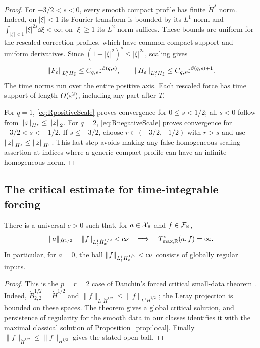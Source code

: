 \begin{proof}
For $-3/2<s<0$, every smooth compact profile has finite $\dot H^s$ norm. Indeed, on $|\xi|<1$ its Fourier transform is bounded by its $L^1$ norm and $\int_{|\xi|<1}|\xi|^{2s}\dd\xi<\infty$; on $|\xi|\ge1$ its $L^2$ norm suffices. These bounds are uniform for the rescaled correction profiles, which have common compact support and uniform derivatives. Since
$(1+|\xi|^2)^s\le|\xi|^{2s}$, scaling gives
\begin{equation}\label{eq:RnegativeScale}
 \left\lVert F_\varepsilon\right\rVert_{L^q_tH^s_x}\le C_{q,s}\varepsilon^{\beta(q,s)},\qquad
 \left\lVert H_\varepsilon\right\rVert_{L^q_tH^s_x}\le C_{q,s}\varepsilon^{\beta(q,s)+1}.
\end{equation}
The time norms run over the entire positive axis. Each rescaled force has time support of length $O(\varepsilon^2)$, including any part after $T$.

For $q=1$, \eqref{eq:RpositiveScale} proves convergence for $0\le s<1/2$; all $s<0$ follow from $\left\lVert z\right\rVert_{H^s}\le\left\lVert z\right\rVert_2$. For $q=2$, \eqref{eq:RnegativeScale} proves convergence for $-3/2<s<-1/2$. If $s\le-3/2$, choose $r\in(-3/2,-1/2)$ with $r>s$ and use $\left\lVert z\right\rVert_{H^s}\le\left\lVert z\right\rVert_{H^r}$. This last step avoids making any false homogeneous scaling assertion at indices where a generic compact profile can have an infinite homogeneous norm.
\end{proof}

\subsection{The critical estimate for time-integrable forcing}
\begin{proposition}\label{prop:Rcritical1}
There is a universal $c>0$ such that, for $a\in\mathcal X_{\mathbb R}$ and $f\in\mathcal F_{\mathbb R}$,
\[
 \left\lVert a\right\rVert_{\dot H^{1/2}}+\left\lVert f\right\rVert_{L^1_t\dot H^{1/2}_x}<c\nu
 \quad\Longrightarrow\quad T^\nu_{\max,\mathbb R}(a,f)=\infty.
\]
In particular, for $a=0$, the ball $\left\lVert f\right\rVert_{L^1_tH^{1/2}_x}<c\nu$ consists of globally regular inputs.
\end{proposition}
\begin{proof}
This is the $p=r=2$ case of Danchin's forced critical small-data theorem
\cite[Theorem~2.3.1, pp.~47--49]{danchin}. Indeed,
$\dot B^{1/2}_{2,2}=\dot H^{1/2}$ and
$\|f\|_{\widetilde L^1\dot H^{1/2}}\le\|f\|_{L^1\dot H^{1/2}}$;
the Leray projection is bounded on these spaces. The theorem gives a global
critical solution, and persistence of regularity for the smooth data in our
classes identifies it with the maximal classical solution of
Proposition~\ref{prop:local}. Finally
$\|f\|_{\dot H^{1/2}}\le\|f\|_{H^{1/2}}$ gives the stated open ball.
\end{proof}

